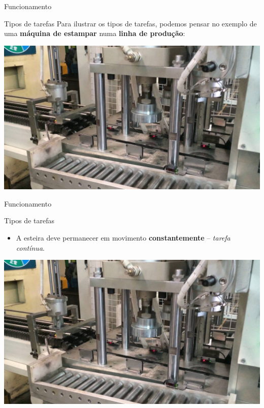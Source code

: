 \begin{frame}{Funcionamento}
	\begin{block}{Tipos de tarefas}
		Para ilustrar os tipos de tarefas, podemos pensar no exemplo de uma \textbf{máquina de estampar} numa \textbf{linha de produção}:
	\end{block}

	\centering
	
	\includegraphics[height=0.6\textheight]{Figuras/Ch09/fig3}
\end{frame}


\begin{frame}{Funcionamento}
	\begin{block}{Tipos de tarefas}
		\begin{itemize}
			\item A esteira deve permanecer em movimento \textbf{constantemente} -- \textit{tarefa contínua}.
		\end{itemize}
	\end{block}
	
	\centering
	
	\includegraphics[height=0.6\textheight]{Figuras/Ch09/fig3}
\end{frame}


